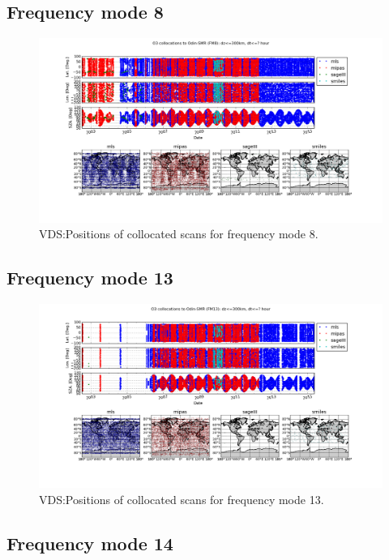 \subsection{Frequency mode 8}

\begin{figure}[t]
\centering
\includegraphics[width=17cm]{test_collocation_fm8.png}
\caption{VDS:Positions of collocated scans for frequency mode 8.}
\label{fig:vdsfm8}
\end{figure}

\clearpage
\newpage

\subsection{Frequency mode 13}

\begin{figure}[t]
\centering
\includegraphics[width=17cm]{test_collocation_fm13.png}
\caption{VDS:Positions of collocated scans for frequency mode 13.}
\label{fig:vdsfm13}
\end{figure}

\clearpage
\newpage

\subsection{Frequency mode 14}

